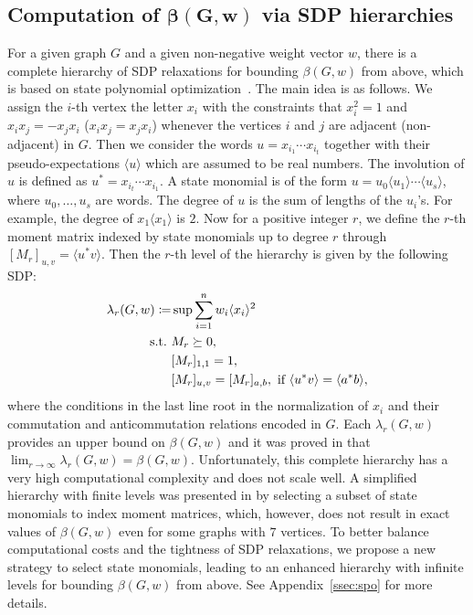 \documentclass[
12pt,
prx,
aps,
reprint,
a4paper,
longbibliograph,
nofootinbib,
nobibnotes,
superscriptaddress
]{revtex4-2}
\theoremstyle{definition}
\begin{document}
\subsection{\texorpdfstring{Computation of  $\mathbf{\beta(G,w)}$  via SDP hierarchies}{}}
\label{sec4a}

For a given graph $G$ and a given non-negative weight vector $w$, there is a complete hierarchy of SDP relaxations for bounding $\beta(G,w)$ from above, which is based on state polynomial optimization~\cite{moran2024Uncertainty,klep2024state}. 
The main idea is as follows.
We assign the $i$-th vertex the letter $x_i$ with the constraints that $x_i^2 = 1$ and $x_i x_j = - x_j x_i$ ($x_ix_j=x_jx_i$) whenever the vertices $i$ and $j$ are adjacent (non-adjacent) in $G$.
Then we consider the words $u=x_{i_1}\cdots x_{i_t}$ together with their pseudo-expectations $\langle u\rangle$ which are assumed to be real numbers.
The involution of $u$ is defined as $u^* = x_{i_t}\cdots x_{i_1}$.
A state monomial is of the form $u = u_0\langle u_1\rangle \cdots \langle u_s\rangle$, where $u_0, \ldots, u_s$ are words. The degree of $u$ is the sum of lengths of the $u_i$'s. For example, the degree of $x_1\langle x_1\rangle$ is $2$.
Now for a positive integer $r$, we define the $r$-th moment matrix indexed by state monomials up to degree $r$ through
$[M_r]_{u,v} = \langle u^*v\rangle$.
Then the $r$-th level of the hierarchy is given by the following SDP:
\begin{equation}\label{eq:hierarchy}
\begin{aligned}
	\lambda_r(G,w) \coloneqq & \sup \sum_{i=1}^n w_i\langle x_i\rangle^2\\
\rm{s.t.}\ & M_r\succeq0,\\
&[M_r]_{1,1}=1,\\
&[M_r]_{u,v}=[M_r]_{a,b}, \text{ if }\langle u^*v\rangle=\langle a^*b\rangle,
\end{aligned}
\end{equation}
where the conditions in the last line root in the normalization of $x_i$ and their commutation and anticommutation relations encoded in $G$. Each $\lambda_r(G,w)$ provides an upper bound on $\beta(G,w)$ and it was proved in \cite{klep2024state} that $\lim_{r\to\infty}\lambda_r(G,w)=\beta(G,w)$. Unfortunately, this complete hierarchy has a very high computational complexity and does not scale well. A simplified hierarchy with finite levels was presented in \cite{moran2024Uncertainty} by selecting a subset of state monomials to index moment matrices, which, however, does not result in exact values of $\beta(G,w)$ even for some graphs with $7$ vertices.
To better balance computational costs and the tightness of SDP relaxations, we propose a new strategy to select state monomials, leading to an enhanced hierarchy with infinite levels for bounding $\beta(G,w)$ from above. See Appendix~\ref{ssec:spo} for more details.
\end{document}
